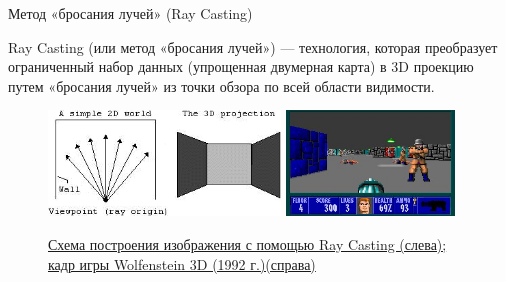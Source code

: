 \documentclass{beamer}
\begin{document}
	\begin{frame}{Метод «бросания лучей» (Ray Casting)}

		Ray Casting (или метод «бросания лучей») --- технология, которая преобразует ограниченный набор данных (упрощенная двумерная карта) в 3D проекцию путем «бросания лучей» из точки обзора по всей области видимости.

		\begin{figure}
			\includegraphics[width=0.55\textwidth]{images/ray-casting.png}
			\includegraphics[width=0.4\textwidth]{images/wolf3d.jpg}
			\caption{
				\href{https://habr.com/ru/articles/515256/}{Схема построения изображения с помощью Ray Casting (слева); кадр игры Wolfenstein 3D (1992 г.)(справа)}
			}
		\end{figure}
		

	\end{frame}
\end{document}
